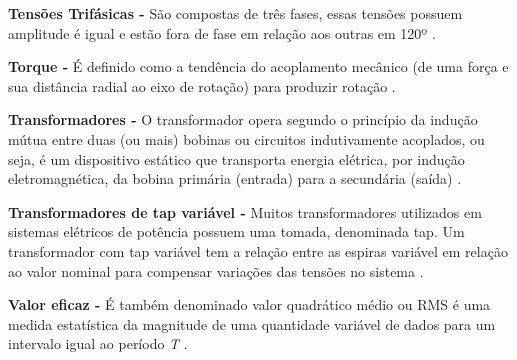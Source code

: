 \noindent
\textbf{Tensões Trifásicas -} São compostas de três fases, essas tensões possuem amplitude é igual e estão fora de fase em relação aos outras em 120º \citep{SAD03}.

\noindent
\textbf{Torque -} É definido como a tendência do acoplamento mecânico (de uma força e sua distância radial ao eixo de rotação) para produzir rotação \citep{KOS93}. 

\noindent
\textbf{Transformadores -} O transformador opera segundo o princípio da indução mútua entre duas (ou mais) bobinas ou circuitos indutivamente acoplados, ou seja, é um dispositivo estático que transporta energia elétrica, por indução eletromagnética, da bobina primária (entrada) para a secundária (saída) \citep{KOS93}. 

\noindent
\textbf{Transformadores de tap variável -} Muitos transformadores utilizados em sistemas elétricos de potência possuem uma tomada, denominada tap. Um transformador com tap variável tem a relação entre as espiras variável em relação ao valor nominal para compensar variações das tensões no sistema \citep{FER11}.

\noindent
\textbf{Valor eficaz -} É também denominado valor quadrático médio ou RMS é uma medida estatística da magnitude de uma quantidade variável de dados para um intervalo igual ao período \textit{T} \citep{BOY04}.
